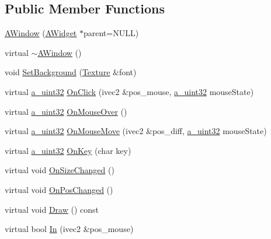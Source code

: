 \subsection*{Public Member Functions}
\begin{DoxyCompactItemize}
\item 
\hyperlink{class_agmd_1_1_a_window_a978b56ae79fbeed8dded9f23f8bfd63a}{A\+Window} (\hyperlink{class_agmd_1_1_a_widget}{A\+Widget} $\ast$parent=N\+U\+L\+L)
\item 
virtual \hyperlink{class_agmd_1_1_a_window_a7abf541e4b8ad4ff2131f96f2c37763b}{$\sim$\+A\+Window} ()
\item 
void \hyperlink{class_agmd_1_1_a_window_aa3f0706dc95de63a338f0782fea2adcf}{Set\+Background} (\hyperlink{class_agmd_1_1_texture}{Texture} \&font)
\item 
virtual \hyperlink{_common_defines_8h_a964296f9770051b9e4807b1f180dd416}{a\+\_\+uint32} \hyperlink{class_agmd_1_1_a_window_a573b3e032717a4802652ecb39352d671}{On\+Click} (ivec2 \&pos\+\_\+mouse, \hyperlink{_common_defines_8h_a964296f9770051b9e4807b1f180dd416}{a\+\_\+uint32} mouse\+State)
\item 
virtual \hyperlink{_common_defines_8h_a964296f9770051b9e4807b1f180dd416}{a\+\_\+uint32} \hyperlink{class_agmd_1_1_a_window_a8b05f14eeccdee50b74437f13e87030b}{On\+Mouse\+Over} ()
\item 
virtual \hyperlink{_common_defines_8h_a964296f9770051b9e4807b1f180dd416}{a\+\_\+uint32} \hyperlink{class_agmd_1_1_a_window_abfedc933f038a4d4cbdebfd4bb0aecb1}{On\+Mouse\+Move} (ivec2 \&pos\+\_\+diff, \hyperlink{_common_defines_8h_a964296f9770051b9e4807b1f180dd416}{a\+\_\+uint32} mouse\+State)
\item 
virtual \hyperlink{_common_defines_8h_a964296f9770051b9e4807b1f180dd416}{a\+\_\+uint32} \hyperlink{class_agmd_1_1_a_window_afb0acc2601624a60a02b51f9f472feb5}{On\+Key} (char key)
\item 
virtual void \hyperlink{class_agmd_1_1_a_window_a3350ddebc8fea2807968939d8a30b059}{On\+Size\+Changed} ()
\item 
virtual void \hyperlink{class_agmd_1_1_a_window_a38c8f508b64d725bb918255b0d923da5}{On\+Pos\+Changed} ()
\item 
virtual void \hyperlink{class_agmd_1_1_a_window_a93b410b17d973df5bb16ae0ddadb45bf}{Draw} () const 
\item 
virtual bool \hyperlink{class_agmd_1_1_a_window_a5fa5a01cdc1b210fd98a19755c9dc748}{In} (ivec2 \&pos\+\_\+mouse)
\end{DoxyCompactItemize}
